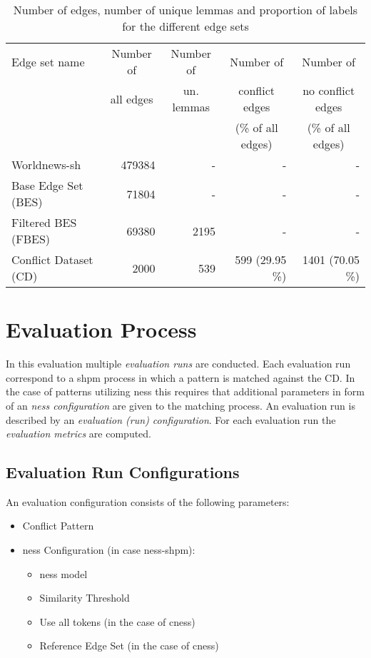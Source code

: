 \documentclass[11pt]{scrreprt}
\begin{document}
{\begin{table}
\centering
\begin{tabular}{lrrrr}
\toprule
\multicolumn{1}{l}{Edge set name}	& \multicolumn{1}{c}{Number of} & \multicolumn{1}{c}{Number of}		& \multicolumn{1}{c}{Number of} 		& \multicolumn{1}{c}{Number of} \\
\multicolumn{1}{l}{} 				& \multicolumn{1}{c}{all edges} & \multicolumn{1}{c}{un. lemmas}			& \multicolumn{1}{c}{conflict edges} 	& \multicolumn{1}{c}{no conflict edges} \\
\multicolumn{1}{l}{} 				& \multicolumn{1}{c}{} 			& \multicolumn{1}{c}{}				& \multicolumn{1}{c}{(\% of all edges)} & \multicolumn{1}{c}{(\% of all edges)} \\
\midrule
Worldnews-\gls{sh}						& 479384		& -			& -					& - \\
Base Edge Set (BES)					& 71804		& -			& -					& - \\
Filtered BES (FBES)					& 69380 		& 2195 		& - 					& - \\
Conflict Dataset (CD)				& 2000 		& 539 		& 599 (29.95 \%) 	& 1401 (70.05 \%) \\
\bottomrule
\end{tabular}
\caption{Number of edges, number of unique lemmas and proportion of labels for the different edge sets}
\label{tab:dataset-descriptions}
\end{table}


\section{Evaluation Process}
In this evaluation multiple \textit{evaluation runs} are conducted. Each evaluation run correspond to a \gls{shpm} process in which a pattern is matched against the CD. In the case of patterns utilizing \gls{ness} this requires that additional parameters in form of an \textit{\gls{ness} configuration} are given to the matching process. An evaluation run is described by an \textit{evaluation (run) configuration}. For each evaluation run the \textit{evaluation metrics} are computed. 


\subsection{Evaluation Run Configurations}
An evaluation configuration consists of the following parameters: 
\begin{itemize}
	\item Conflict Pattern
	\item \gls{ness} Configuration (in case \gls{ness-shpm}): 
	\begin{itemize}
		\item \gls{ness} model
		\item Similarity Threshold 
		\item Use  all tokens (in the case of \gls{cness}) 
		\item Reference Edge Set (in the case of \gls{cness}) 
	\end{itemize}
\end{itemize}

}
\end{document}
